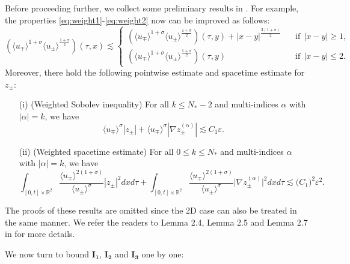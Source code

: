 \documentclass[10pt,reqno]{amsart}
\numberwithin{equation}{section}
\begin{document}
\begin{appendix}
Before proceeding further, we collect some preliminary results in \cite{Li-Yu}. 
For example,  the properties \eqref{eq:weight1}-\eqref{eq:weight2} now can be improved as follows: 
\begin{equation}\label{eq:xgeqleq}
	(\langle u_{\mp}\rangle^{1+\sigma}\langle u_{\pm}\rangle^{\frac{1+\sigma}{2}})(\tau,x)\lesssim\begin{cases}
		(\langle u_{\mp}\rangle^{1+\sigma}\langle u_{\pm}\rangle^{\frac{1+\sigma}{2}})(\tau,y)+|x-y|^{\frac{3(1+\sigma)}{2}}&\ \ \ \ \text{if}\ \  |x-y|\geqslant 1,\\
		(\langle u_{\mp}\rangle^{1+\sigma}\langle u_{\pm}\rangle^{\frac{1+\sigma}{2}})(\tau,y)&\ \ \ \ \text{if}\ \  |x-y|\leqslant 2.
	\end{cases}
\end{equation}
Moreover, 
there hold the following pointwise estimate and spacetime estimate for $z_\pm$:
\begin{enumerate}
	\item[(i)] (Weighted Sobolev inequality)
	For all $k\leqslant N_*-2$ and multi-indices $\alpha$ with $\left|\alpha\right|=k$, we have	
	\begin{equation}\label{eq:Sobolev}
		\langle u_{\mp}\rangle^\sigma|z_{\pm}|+\langle u_{\mp}\rangle^\sigma|\nabla z_{\pm}^{(\alpha)}|\lesssim C_1\varepsilon.
	\end{equation}
	\item[(ii)] (Weighted spacetime estimate)
	For all $0\leqslant k\leqslant N_*$ and multi-indices $\alpha$ with $\left|\alpha\right|=k$, we have
	\begin{equation}\label{eq:flux}
		\int_{[0,t]\times\mathbb{R}^2}\frac{\langle u_{\mp}\rangle^{2(1+\sigma)}}{\langle u_{\pm}\rangle^{\sigma}}|z_{\pm}|^2dxd\tau+\int_{[0,t]\times\mathbb{R}^2}\frac{\langle u_{\mp}\rangle^{2(1+\sigma)}}{\langle u_{\pm}\rangle^{\sigma}}\big|\nabla z^{(\alpha)}_{\pm}\big|^2dxd\tau\lesssim \big(C_1\big)^2\varepsilon^2.
	\end{equation}
\end{enumerate}  
The proofs of these results are omitted since the 2D case can also be treated in the same manner. We refer the readers to Lemma 2.4, Lemma 2.5 and Lemma 2.7 in \cite{Li-Yu} for more details. 

We now turn to bound $\mathbf{I_1}$, $\mathbf{I_2}$ and $\mathbf{I_3}$ one by one:


\end{appendix}
\end{document}

